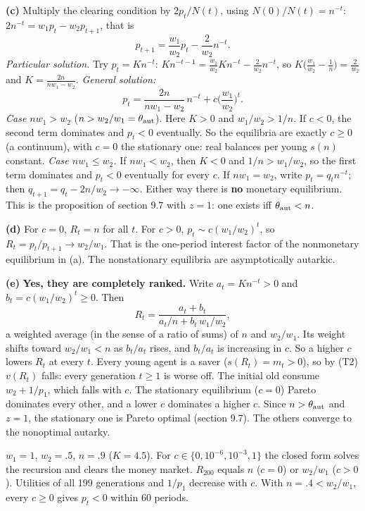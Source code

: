 \documentclass[12pt, letterpaper]{article}
\begin{document}
\begin{tcolorbox}[oddbox,title={Exercise 9.5 \quad All monetary equilibria with growth}]
\textbf{(c)} Multiply the clearing condition by $2p_t/N(t)$, using $N(0)/N(t)=n^{-t}$:
$2n^{-t}=w_1p_t-w_2p_{t+1}$, that is
\[
p_{t+1}=\frac{w_1}{w_2}p_t-\frac{2}{w_2}n^{-t}.
\]
\emph{Particular solution.} Try $p_t=Kn^{-t}$: $Kn^{-t-1}=\frac{w_1}{w_2}Kn^{-t}-\frac2{w_2}n^{-t}$, so
$K\big(\frac{w_1}{w_2}-\frac1n\big)=\frac2{w_2}$ and $K=\frac{2n}{nw_1-w_2}$. \emph{General
solution:}
\[
\boxed{p_t=\frac{2n}{nw_1-w_2}\,n^{-t}+c\Big(\frac{w_1}{w_2}\Big)^t .}
\]
\emph{Case $nw_1>w_2$} ($n>w_2/w_1=\theta_{\rm aut}$). Here $K>0$ and $w_1/w_2>1/n$. If $c<0$, the
second term dominates and $p_t<0$ eventually. So the equilibria are exactly $c\ge0$ (a continuum),
with $c=0$ the stationary one: real balances per young $s(n)$ constant.
\emph{Case $nw_1\le w_2$.} If $nw_1<w_2$, then $K<0$ and $1/n>w_1/w_2$, so the first term dominates
and $p_t<0$ eventually for every $c$. If $nw_1=w_2$, write $p_t=q_tn^{-t}$; then
$q_{t+1}=q_t-2n/w_2\to-\infty$. Either way there is \textbf{no} monetary equilibrium. This is the
proposition of section 9.7 with $z=1$: one exists iff $\theta_{\rm aut}<n$.

\textbf{(d)} For $c=0$, $R_t=n$ for all $t$. For $c>0$, $p_t\sim c(w_1/w_2)^t$, so
$R_t=p_t/p_{t+1}\to w_2/w_1$. That is the one-period interest factor of the nonmonetary equilibrium in
(a). The nonstationary equilibria are asymptotically autarkic.

\textbf{(e)} \textbf{Yes, they are completely ranked.} Write $a_t=Kn^{-t}>0$ and $b_t=c(w_1/w_2)^t\ge0$.
Then
\[
R_t=\frac{a_t+b_t}{a_t/n+b_t\,w_1/w_2},
\]
a weighted average (in the sense of a ratio of sums) of $n$ and $w_2/w_1$. Its weight shifts
toward $w_2/w_1<n$ as $b_t/a_t$ rises, and $b_t/a_t$ is increasing in $c$. So a higher $c$ lowers
$R_t$ at every $t$. Every young agent is a saver ($s(R_t)=m_t>0$), so by (T2) $v(R_t)$ falls: every
generation $t\ge1$ is worse off. The initial old consume $w_2+1/p_1$, which falls with $c$. The
stationary equilibrium ($c=0$) Pareto dominates every other, and a lower $c$ dominates a higher $c$.
Since $n>\theta_{\rm aut}$ and $z=1$, the stationary one is Pareto optimal (section 9.7). The others
converge to the nonoptimal autarky.

\begin{tcolorbox}[databox]
$w_1=1$, $w_2=.5$, $n=.9$ ($K=4.5$). For $c\in\{0,10^{-6},10^{-3},1\}$ the closed form solves the
recursion and clears the money market. $R_{200}$ equals $n$ ($c=0$) or $w_2/w_1$ ($c>0$). Utilities of
all 199 generations and $1/p_1$ decrease with $c$. With $n=.4<w_2/w_1$, every $c\ge0$ gives $p_t<0$
within 60 periods.
\end{tcolorbox}
\end{tcolorbox}
\end{document}
